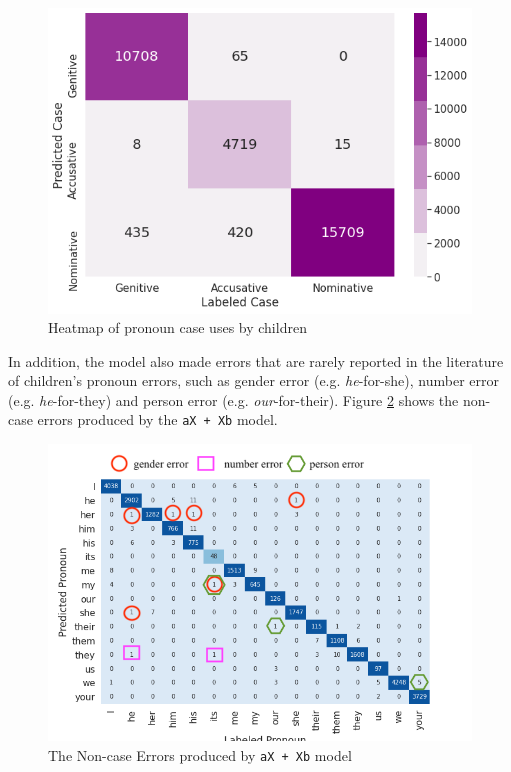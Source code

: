 \FloatBarrier
\begin{figure}[!h]
    \centering
    \includegraphics[scale = 0.45]{graph/chiheatmap.png}
    \caption{Heatmap of pronoun case uses by children}
    \label{fig:heatmapchi}
\end{figure}
\FloatBarrier

In addition, the model also made errors that are rarely reported in the literature of children's pronoun errors, such as gender error (e.g. \textit{he}-for-she), number error (e.g. \textit{he}-for-they) and person error (e.g. \textit{our}-for-their). Figure \ref{fig:circle} shows the non-case errors produced by the \texttt{aX + Xb} model. 

\FloatBarrier
\begin{figure}
    \centering
    \includegraphics[scale = 0.55]{circle.png}
    \caption{The Non-case Errors produced by \texttt{aX + Xb} model}
    \label{fig:circle}
\end{figure}
\FloatBarrier



